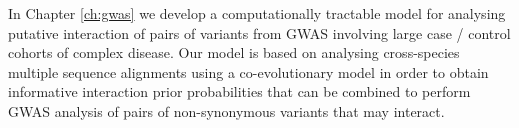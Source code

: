 In Chapter \ref{ch:gwas} we develop a computationally tractable model for analysing putative interaction of pairs of variants from GWAS involving large case / control cohorts of complex disease. Our model is based on analysing cross-species multiple sequence alignments using a co-evolutionary model in order to obtain informative interaction prior probabilities that can be combined to perform GWAS analysis of pairs of non-synonymous variants that may interact.

%
